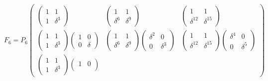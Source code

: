 \[
    F_6
    = P_6
    \begin{pmatrix}
        \begin{pmatrix}
            1 & 1        \\
            1 & \delta^3
        \end{pmatrix}
        &
        \begin{pmatrix}
            1        & 1        \\
            \delta^6 & \delta^9
        \end{pmatrix}
        &
        \begin{pmatrix}
            1           & 1           \\
            \delta^{12} & \delta^{15}
        \end{pmatrix}
        \\
        \begin{pmatrix}
            1 & 1        \\
            1 & \delta^3
        \end{pmatrix}
        \begin{pmatrix}
            1 & 0      \\
            0 & \delta
        \end{pmatrix}
        &
        \begin{pmatrix}
            1        & 1        \\
            \delta^6 & \delta^9
        \end{pmatrix}
        \begin{pmatrix}
            \delta^2 & 0        \\
            0        & \delta^3
        \end{pmatrix}
        &
        \begin{pmatrix}
            1           & 1           \\
            \delta^{12} & \delta^{15}
        \end{pmatrix}
        \begin{pmatrix}
            \delta^4 & 0        \\
            0        & \delta^5
        \end{pmatrix}
        \\
        \begin{pmatrix}
            1 & 1        \\
            1 & \delta^3
        \end{pmatrix}
        \begin{pmatrix}
            1 & 0        \\

\end{pmatrix}
\end{pmatrix}\]
